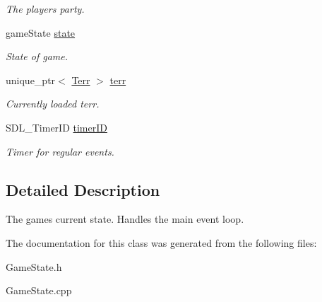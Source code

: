 \begin{DoxyCompactItemize}
\begin{DoxyCompactList}\small\item\em The player\textquotesingle{}s party. \end{DoxyCompactList}\item 
game\+State \hyperlink{class_game_state_a90969808e5db25eb4f0ae6b7be027c65}{state}\hypertarget{class_game_state_a90969808e5db25eb4f0ae6b7be027c65}{}\label{class_game_state_a90969808e5db25eb4f0ae6b7be027c65}

\begin{DoxyCompactList}\small\item\em State of game. \end{DoxyCompactList}\item 
unique\+\_\+ptr$<$ \hyperlink{class_terr}{Terr} $>$ \hyperlink{class_game_state_ae2450c36c6b73d979978b22523f3521c}{terr}\hypertarget{class_game_state_ae2450c36c6b73d979978b22523f3521c}{}\label{class_game_state_ae2450c36c6b73d979978b22523f3521c}

\begin{DoxyCompactList}\small\item\em Currently loaded terr. \end{DoxyCompactList}\item 
S\+D\+L\+\_\+\+Timer\+ID \hyperlink{class_game_state_a69d14a618108634864b0b547a5e1b5c5}{timer\+ID}\hypertarget{class_game_state_a69d14a618108634864b0b547a5e1b5c5}{}\label{class_game_state_a69d14a618108634864b0b547a5e1b5c5}

\begin{DoxyCompactList}\small\item\em Timer for regular events. \end{DoxyCompactList}\end{DoxyCompactItemize}


\subsection{Detailed Description}
The game\textquotesingle{}s current state. Handles the main event loop. 

The documentation for this class was generated from the following files\+:\begin{DoxyCompactItemize}
\item 
Game\+State.\+h\item 
Game\+State.\+cpp\end{DoxyCompactItemize}
